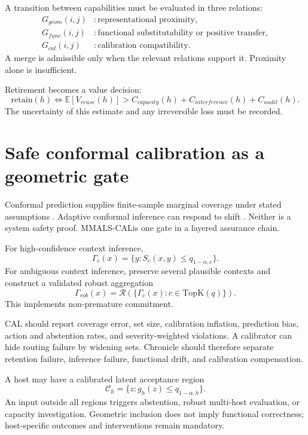 \documentclass[11pt,a4paper]{article}
\newcommand{\CAL}{\textsc{MMALS-CAL}}
\begin{document}
A transition between capabilities must be evaluated in three relations:
\begin{align}
G_{geom}(i,j)&: \text{representational proximity},\\
G_{func}(i,j)&: \text{functional substitutability or positive transfer},\\
G_{cal}(i,j)&: \text{calibration compatibility}.
\end{align}
A merge is admissible only when the relevant relations support it. Proximity alone is insufficient.

Retirement becomes a value decision:
\begin{equation}
\mathrm{retain}(h)\iff \mathbb{E}[V_{reuse}(h)]>C_{capacity}(h)+C_{interference}(h)+C_{audit}(h).
\end{equation}
The uncertainty of this estimate and any irreversible loss must be recorded.

\section{Safe conformal calibration as a geometric gate}
Conformal prediction supplies finite-sample marginal coverage under stated assumptions \cite{vovk2005algorithmic,angelopoulos2023conformal}. Adaptive conformal inference can respond to shift \cite{gibbs2021adaptive}. Neither is a system safety proof. \CAL is one gate in a layered assurance chain.

For high-confidence context inference,
\begin{equation}
\Gamma_c(x)=\{y:S_c(x,y)\le q_{1-\alpha,c}\}.
\end{equation}
For ambiguous context inference, preserve several plausible contexts and construct a validated robust aggregation
\begin{equation}
\Gamma_{rob}(x)=\mathcal{R}\left(\{\Gamma_c(x):c\in\mathrm{TopK}(q)\}\right).
\end{equation}
This implements non-premature commitment.

CAL should report coverage error, set size, calibration inflation, prediction bias, action and abstention rates, and severity-weighted violations. A calibrator can hide routing failure by widening sets. Chronicle should therefore separate retention failure, inference failure, functional drift, and calibration compensation.

A host may have a calibrated latent acceptance region
\begin{equation}
\mathcal{C}_h=\{z:g_h(z)\le q_{1-\alpha,h}\}.
\end{equation}
An input outside all regions triggers abstention, robust multi-host evaluation, or capacity investigation. Geometric inclusion does not imply functional correctness; host-specific outcomes and interventions remain mandatory.
\end{document}
